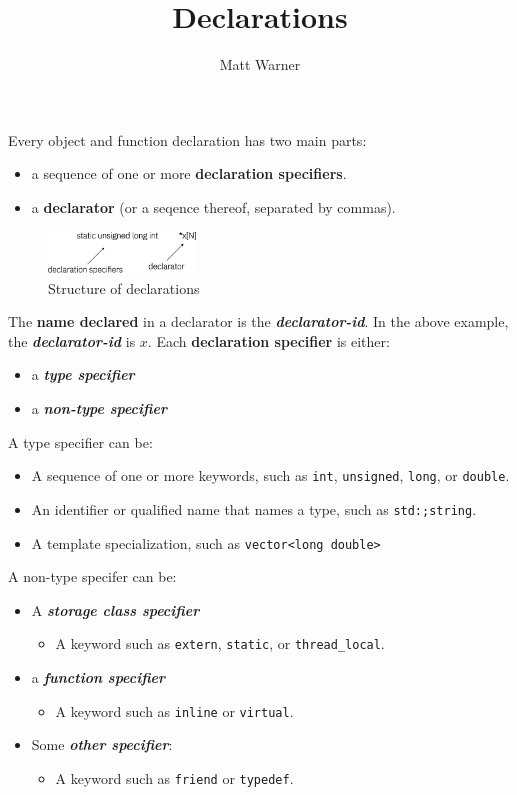 \documentclass{report}
\title{\Huge{Declarations}}
\author{\huge{Matt Warner}}
\date{\huge{}}
\begin{document}
    \maketitle
\noindent Every object and function declaration has two main parts:
\begin{itemize}
    \item a sequence of one or more \textbf{declaration specifiers}.
    \item a \textbf{declarator} (or a seqence thereof, separated by commas).
\end{itemize}
\bigbreak \noindent
\begin{figure}[H]
\centering
\includegraphics[width=0.35\textwidth]{ ./figures/1.png }
\caption{Structure of declarations}
\end{figure}
\noindent The \textbf{name declared} in a declarator is the \textit{\textbf{declarator-id}}. In the above example, the \textit{\textbf{declarator-id}} is $x$.
\bigbreak \noindent
Each \textbf{declaration specifier} is either:
\begin{itemize}
    \item a \textit{\textbf{type specifier}}
    \item a \textit{\textbf{non-type specifier}}
\end{itemize}
A type specifier can be:
\begin{itemize}
    \item A sequence of one or more keywords, such as \texttt{int}, \texttt{unsigned}, \texttt{long}, or \texttt{double}.
    \item An identifier or qualified name that names a type, such as \texttt{std:;string}.
    \item A template specialization, such as \texttt{vector<long double>}
\end{itemize}
A non-type specifer can be:
\begin{itemize}
    \item A \textit{\textbf{storage class specifier}}
        \begin{itemize}[label=$\circ$]
            \item A keyword such as \texttt{extern}, \texttt{static}, or \texttt{thread\_local}.
        \end{itemize}
    \item a \textit{\textbf{function specifier}}
        \begin{itemize}[label=$\circ$]
            \item A keyword such as \texttt{inline} or \texttt{virtual}.
        \end{itemize}
    \item Some \textit{\textbf{other specifier}}:
        \begin{itemize}[label=$\circ$]
            \item A keyword such as \texttt{friend} or \texttt{typedef}.
        \end{itemize}
\end{itemize}
\end{document}
